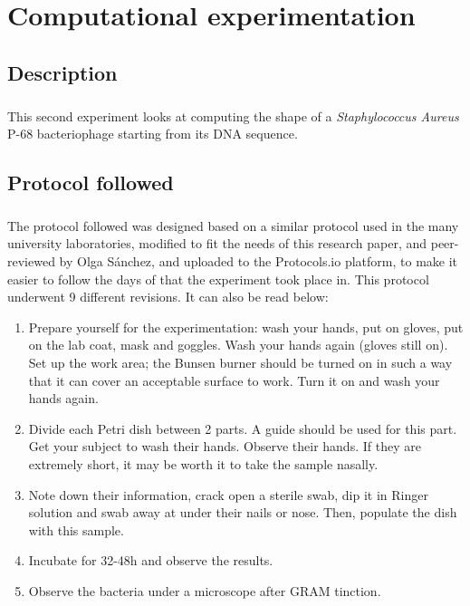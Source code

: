 \chapter{Computational experimentation}
\section{Description}
\paragraph{}This second experiment looks at computing the shape of a \emph{Staphylococcus Aureus} P-68 bacteriophage starting from its DNA sequence.
\section{Protocol followed}
\paragraph{}The protocol followed was designed based on a similar protocol used in the many university laboratories\cite{olearyPracticalHandbookMicrobiology1989}, modified to fit the needs of this research paper, and peer-reviewed by Olga Sánchez, and uploaded to the Protocols.io platform, to make it easier to follow the days of that the experiment took place in. This protocol underwent 9 different revisions\cite{rocacugatStaphilococcusAureusSampling2022a}. It can also be read below:
\begin{enumerate}[label=\arabic*)]
\item Prepare yourself for the experimentation: wash your hands, put on gloves, put on the lab coat, mask and goggles. Wash your hands again (gloves still on). Set up the work area; the Bunsen burner should be turned on in such a way that it can cover an acceptable surface to work. Turn it on and wash your hands again.
\item Divide each Petri dish between 2 parts. A guide should be used for this part. Get your subject to wash their hands. Observe their hands. If they are extremely short, it may be worth it to take the sample nasally.
\item Note down their information, crack open a sterile swab, dip it in Ringer solution and swab away at under their nails or nose. Then, populate the dish with this sample.
\item Incubate for 32-48h and observe the results.
\item Observe the bacteria under a microscope after GRAM tinction.
\end{enumerate}
